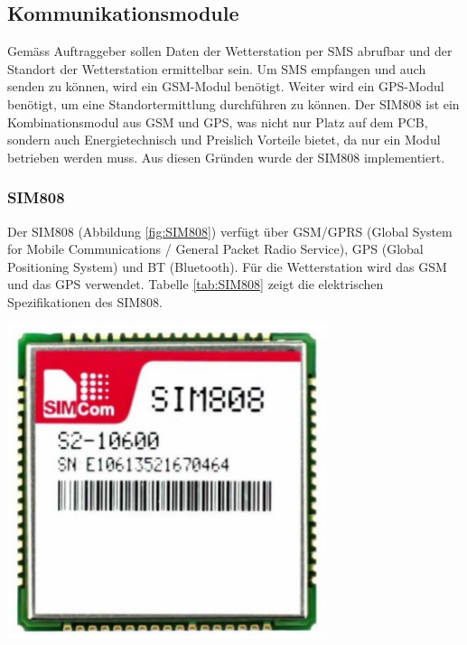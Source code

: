 \subsection{Kommunikationsmodule}
\label{subsec:Kommunikationsmodule}
Gemäss Auftraggeber sollen Daten der Wetterstation per SMS abrufbar und der Standort der Wetterstation ermittelbar sein. Um SMS empfangen und auch senden zu können, wird ein GSM-Modul benötigt. Weiter wird ein GPS-Modul benötigt, um eine Standortermittlung durchführen zu können. Der SIM808 ist ein Kombinationsmodul aus GSM und GPS, was nicht nur Platz auf dem PCB, sondern auch Energietechnisch und Preislich Vorteile bietet, da nur ein Modul betrieben werden muss. Aus diesen Gründen wurde der SIM808 implementiert.

\subsubsection{SIM808}
{\begin{minipage}[b][6cm][t]{0.52\textwidth}
Der SIM808 (Abbildung \ref{fig:SIM808}) verfügt über GSM/GPRS (Global System for Mobile Communications / General Packet Radio Service), GPS (Global Positioning System) und BT (Bluetooth). Für die Wetterstation wird das GSM und das GPS verwendet. Tabelle \ref{tab:SIM808} zeigt die elektrischen Spezifikationen des SIM808. \cite{SIM808}\\
\end{minipage}}
{\begin{minipage}[b][6cm][t]{0.47\textwidth}
\centering
\includegraphics[width=0.7\textwidth]{graphics/SIM808/SIM808.JPG}
\label{fig:SIM808}
\end{minipage}}


